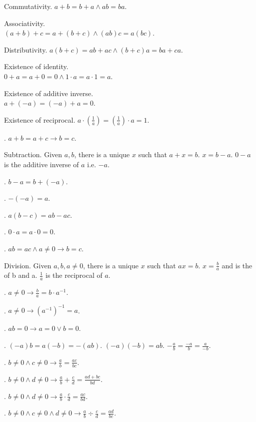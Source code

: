 \documentclass{slnotes}
\begin{document}
 Commutativity. \(a + b = b + a \land ab = ba\).

 Associativity.\\\((a + b) + c = a + (b + c) \land (ab)c = a(bc)\).

 Distributivity. \(a(b + c) = ab + ac \land (b + c)a = ba + ca\).

 Existence of identity.\\\(0 + a = a + 0 = 0 \land 1 \cdot a = a \cdot 1 = a\).

 Existence of additive inverse.\\\(a + (-a) = (-a) + a = 0\).

 Existence of reciprocal. \(a \cdot \left(\frac{1}{a}\right) = \left(\frac{1}{a}\right) \cdot a = 1\).

. \(a + b = a + c \to b = c\).

 Subtraction. Given \(a, b\), there is a unique \(x\) such that \(a + x = b\). \(x = b - a\). \(0 - a\) is the additive inverse of \(a\) i.e. \(-a\).

. \(b - a = b + (-a)\).

. \(-(-a) = a\).

. \(a(b - c) = ab - ac\).

. \(0 \cdot a = a \cdot 0 = 0\).

. \(ab = ac \land a \neq 0 \to b = c\).

 Division. Given \(a, b, a \neq 0\), there is a unique \(x\) such that \(ax = b\). \(x = \frac{b}{a}\) and is the  of b and a. \(\frac{1}{a}\) is the reciprocal of \(a\).

. \(a \neq 0 \to \frac{b}{a} = b \cdot a^{-1}\).

. \(a \neq 0 \to (a^{-1})^{-1} = a\).

. \(ab = 0 \to a = 0 \lor b = 0\).

. \((-a)b = a(-b) = -(ab)\). \((-a)(-b) = ab\). \(-\frac{a}{b} = \frac{-a}{b} = \frac{a}{-b}\).

. \(b \neq 0 \land c \neq 0 \to \frac{a}{b} = \frac{ac}{bc}\).

. \(b \neq 0 \land d \neq 0 \to \frac{a}{b} + \frac{c}{d} = \frac{ad + bc}{bd}\).

. \(b \neq 0 \land d \neq 0 \to \frac{a}{b} \cdot \frac{c}{d} = \frac{ac}{bd}\).

. \(b \neq 0 \land c \neq 0 \land d \neq 0 \to \frac{a}{b} \div \frac{c}{d} = \frac{ad}{bc}\).
\end{document}
